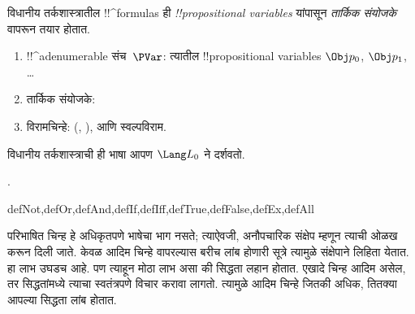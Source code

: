 \documentclass[../../../include/open-logic-section]{subfiles}
\begin{document}


विधानीय तर्कशास्त्रातील !!^{formula}s ही
\emph{!!{propositional
    variable}s} यांपासून \emph{तार्किक
  संयोजके} वापरून तयार होतात.

\begin{enumerate}
\item !!^a{denumerable} संच~$\PVar$: त्यातील !!{propositional variable}s
  $\Obj p_0$, $\Obj p_1$, \dots
{}
\item तार्किक संयोजके:
  \startycommalist
\item विरामचिन्हे: (, ), आणि स्वल्पविराम.
\end{enumerate}

विधानीय तर्कशास्त्राची ही भाषा आपण $\Lang L_0$ ने दर्शवतो.

.

\begin{tagblock}{defNot,defOr,defAnd,defIf,defIff,defTrue,defFalse,defEx,defAll}
\begin{explain}
परिभाषित चिन्ह हे अधिकृतपणे भाषेचा भाग नसते; त्याऐवजी, अनौपचारिक
संक्षेप म्हणून त्याची ओळख करून दिली जाते. केवळ आदिम चिन्हे वापरल्यास
बरीच लांब होणारी सूत्रे त्यामुळे संक्षेपाने लिहिता येतात. हा लाभ
उघडच आहे. पण त्याहून मोठा लाभ असा की सिद्धता लहान होतात. एखादे चिन्ह
आदिम असेल, तर सिद्धतांमध्ये त्याचा स्वतंत्रपणे विचार करावा लागतो.
त्यामुळे आदिम चिन्हे जितकी अधिक, तितक्या आपल्या सिद्धता लांब होतात.
\end{explain}
\end{tagblock}
\end{document}
